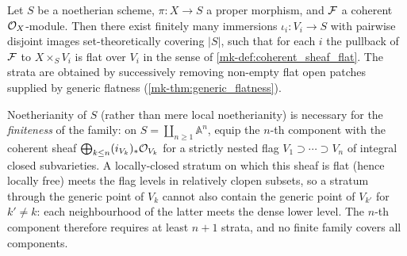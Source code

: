 \begin{lemma}\label{mk-lem:flat_locus_reduction_lean}
  \leanok

  Let \(S\) be a noetherian scheme, \(\pi : X \to S\) a proper morphism,
  and \(\mathcal{F}\) a coherent \(\mathcal{O}_X\)-module. Then there exist finitely many
  immersions \(\iota_i : V_i \to S\) with pairwise disjoint images
  set-theoretically covering \(|S|\), such that for each \(i\) the pullback of
  \(\mathcal{F}\) to \(X \times_S V_i\) is flat over \(V_i\) in the sense of
  \ref{mk-def:coherent_sheaf_flat}.  The strata are obtained by successively
  removing non-empty flat open patches supplied by generic flatness
  (\ref{mk-thm:generic_flatness}).

  Noetherianity of \(S\) (rather than mere local noetherianity) is necessary
  for the \emph{finiteness} of the family: on
  \(S = \coprod_{n \ge 1} \mathbb{A}^n\), equip the \(n\)-th component with
  the coherent sheaf \(\bigoplus_{k \le n} (i_{V_k})_* \mathcal{O}_{V_k}\) for a
  strictly nested flag \(V_1 \supset \cdots \supset V_n\) of integral closed
  subvarieties.  A locally-closed stratum on which this sheaf is flat (hence
  locally free) meets the flag levels in relatively clopen subsets, so a
  stratum through the generic point of \(V_k\) cannot also contain the
  generic point of \(V_{k'}\) for \(k' \neq k\): each neighbourhood of the
  latter meets the dense lower level.  The \(n\)-th component therefore
  requires at least \(n + 1\) strata, and no finite family covers all
  components.
\end{lemma}

